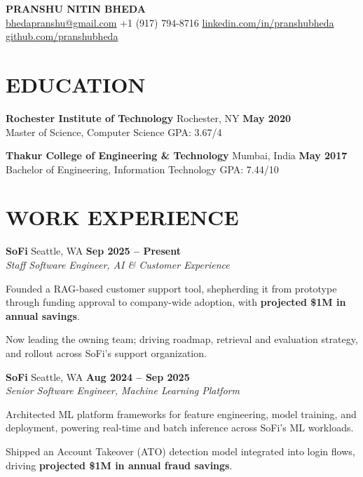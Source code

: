 \documentclass[10pt, letterpaper]{article}
\newcommand{\employer}[4]{%
  \textbf{#1} \;\textbullet\; #2 \hfill \textbf{#3} \\[0pt]
  {\itshape #4}%
}
\newcommand{\school}[4]{%
  \textbf{#1} \;\textbullet\; #2 \hfill \textbf{#3} \\[0pt]
  #4%
}
\begin{document}
\begin{center}
  {\LARGE\bfseries PRANSHU NITIN BHEDA} \\[3pt]
  \small
  \href{mailto:bhedapranshu@gmail.com}{bhedapranshu@gmail.com} \;\textbullet\;
  +1 (917) 794-8716 \;\textbullet\;
  \href{https://www.linkedin.com/in/pranshubheda/}{linkedin.com/in/pranshubheda} \;\textbullet\;
  \href{https://github.com/pranshubheda}{github.com/pranshubheda}
\end{center}

\section{EDUCATION}

\school{Rochester Institute of Technology}{Rochester, NY}{May 2020}{Master of Science, Computer Science \hfill GPA: 3.67/4}

\vspace{3pt}

\school{Thakur College of Engineering \& Technology}{Mumbai, India}{May 2017}{Bachelor of Engineering, Information Technology \hfill GPA: 7.44/10}

\section{WORK EXPERIENCE}

\employer{SoFi}{Seattle, WA}{Sep 2025 -- Present}{Staff Software Engineer, AI \& Customer Experience}
\begin{cvitems}
  \item Founded a RAG-based customer support tool, shepherding it from prototype through funding approval to company-wide adoption, with \textbf{projected \$1M in annual savings}.
  \item Now leading the owning team; driving roadmap, retrieval and evaluation strategy, and rollout across SoFi's support organization.
\end{cvitems}

\vspace{2pt}
\employer{SoFi}{Seattle, WA}{Aug 2024 -- Sep 2025}{Senior Software Engineer, Machine Learning Platform}
\begin{cvitems}
  \item Architected ML platform frameworks for feature engineering, model training, and deployment, powering real-time and batch inference across SoFi's ML workloads.
  \item Shipped an Account Takeover (ATO) detection model integrated into login flows, driving \textbf{projected \$1M in annual fraud savings}.
\end{cvitems}
\end{document}
